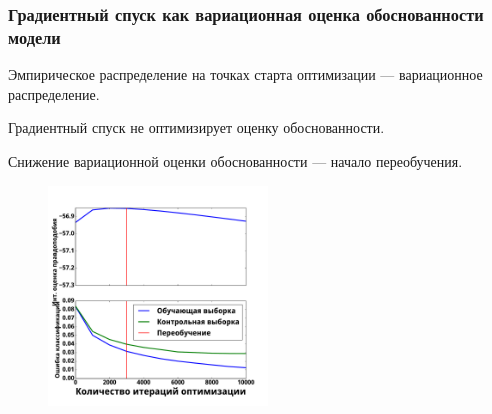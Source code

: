 \documentclass[usenames,dvipsnames,11pt,pdf,utf8,russian,aspectratio=43]{beamer}
\begin{document}
\begin{frame}

\frametitle{Градиентный спуск как вариационная оценка обоснованности модели}
\footnotesize
Эмпирическое распределение на точках старта оптимизации --- вариационное распределение.\\


\begin{multicols}{2}
Градиентный спуск не оптимизирует оценку обоснованности.
\vspace{-1.cm}
\begin{figure}

\end{figure}

\columnbreak

Снижение вариационной оценки обоснованности ---  начало переобучения.
\vspace{-1.2cm}
\begin{figure}
{\includegraphics[width=0.52\textwidth]{./slide_plots/sgd_show.pdf}}
\end{figure}
\end{multicols}
\end{frame}
\end{document}

